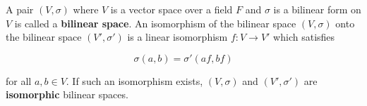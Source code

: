A pair $(V, \sigma)$ where $V$ is a vector space over a field $F$ and $\sigma$ is a bilinear form on $V$ is called a \textbf{bilinear space}. An isomorphism of the bilinear space $(V, \sigma)$ onto the bilinear space $(V', \sigma')$ is a linear isomorphism $f: V \to V'$ which satisfies

$$\sigma(a, b) = \sigma'(af, bf)$$

for all $a, b \in V$. If such an isomorphism exists, $(V, \sigma)$ and $(V', \sigma')$ are \textbf{isomorphic} bilinear spaces.
